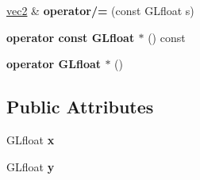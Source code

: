 \begin{DoxyCompactItemize}
\item 
\hypertarget{struct_angel_1_1vec2_a0739a7464b89dc5b40fae5c423711e11}{\hyperlink{struct_angel_1_1vec2}{vec2} \& {\bfseries operator/=} (const \-G\-Lfloat s)}\label{struct_angel_1_1vec2_a0739a7464b89dc5b40fae5c423711e11}

\item 
\hypertarget{struct_angel_1_1vec2_a5c3d2082bcc18734fde3689dbc605104}{{\bfseries operator const G\-Lfloat $\ast$} () const }\label{struct_angel_1_1vec2_a5c3d2082bcc18734fde3689dbc605104}

\item 
\hypertarget{struct_angel_1_1vec2_a8989f46bc38bb87bc2f6ea81f66c8545}{{\bfseries operator G\-Lfloat $\ast$} ()}\label{struct_angel_1_1vec2_a8989f46bc38bb87bc2f6ea81f66c8545}

\end{DoxyCompactItemize}
\subsection*{\-Public \-Attributes}
\begin{DoxyCompactItemize}
\item 
\hypertarget{struct_angel_1_1vec2_ab99b91871c08bbf76bf4a5e554ccac8f}{\-G\-Lfloat {\bfseries x}}\label{struct_angel_1_1vec2_ab99b91871c08bbf76bf4a5e554ccac8f}

\item 
\hypertarget{struct_angel_1_1vec2_a9f0e4c33e7884eca47d771ccfd4ea0bd}{\-G\-Lfloat {\bfseries y}}\label{struct_angel_1_1vec2_a9f0e4c33e7884eca47d771ccfd4ea0bd}

\end{DoxyCompactItemize}
